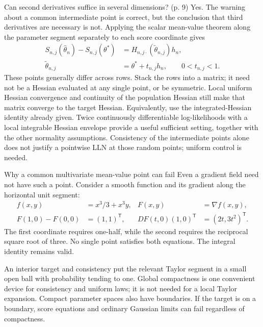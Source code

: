 \documentclass[12pt]{article}
\begin{document}
\begin{todobox}{Can second derivatives suffice in several dimensions? (p. 9)}
Yes. The warning about a common intermediate point is correct, but the
conclusion that third derivatives are necessary is not. Applying the
scalar mean-value theorem along the parameter segment separately to each
score coordinate gives
\begin{align}
 S_{n,j}(\widehat\theta_n)-S_{n,j}(\theta^*)
 &=H_{n,j\cdot}(\widetilde\theta_{n,j})h_n,\\
 \widetilde\theta_{n,j}&=\theta^*+t_{n,j}h_n,
 \qquad 0<t_{n,j}<1.
\end{align}
These points generally differ across rows. Stack the rows into a matrix;
it need not be a Hessian evaluated at any single point, or be symmetric.
Local uniform Hessian convergence and continuity of the population Hessian
still make that matrix converge to the target Hessian. Equivalently,
use the integrated-Hessian identity already given. Twice continuously
differentiable log-likelihoods with a local integrable Hessian envelope
provide a useful sufficient setting, together with the other normality
assumptions. Consistency of the intermediate points alone does not justify
a pointwise LLN at those random points; uniform control is needed.
\end{todobox}
\begin{conceptbox}{Why a common multivariate mean-value point can fail}
Even a gradient field need not have such a point. Consider a smooth function
and its gradient along the horizontal unit segment:
\begin{align}
 f(x,y)&=x^3/3+x^3y,&F(x,y)&=\nabla f(x,y),\\
 F(1,0)-F(0,0)&=(1,1)^{\mathsf T},&
 DF(t,0)(1,0)^{\mathsf T}&=(2t,3t^2)^{\mathsf T}.
\end{align}
The first coordinate requires one-half, while the second requires the
reciprocal square root of three. No single point satisfies both equations.
The integral identity remains valid.
\end{conceptbox}

\begin{remarkbox}
An interior target and consistency put the relevant Taylor segment in a
small open ball with probability tending to one. Global compactness is
one convenient device for consistency and uniform laws; it is not needed
for a local Taylor expansion. Compact parameter spaces also have boundaries.
If the target is on a boundary, score equations and ordinary Gaussian
limits can fail regardless of compactness.
\end{remarkbox}
\end{document}
